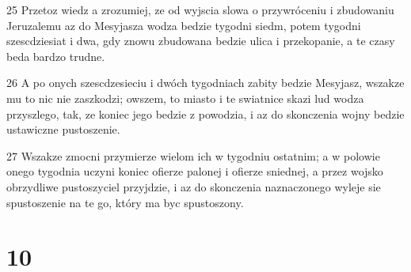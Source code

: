 \par 25 Przetoz wiedz a zrozumiej, ze od wyjscia slowa o przywróceniu i zbudowaniu Jeruzalemu az do Mesyjasza wodza bedzie tygodni siedm, potem tygodni szescdziesiat i dwa, gdy znowu zbudowana bedzie ulica i przekopanie, a te czasy beda bardzo trudne.
\par 26 A po onych szescdzesieciu i dwóch tygodniach zabity bedzie Mesyjasz, wszakze mu to nic nie zaszkodzi; owszem, to miasto i te swiatnice skazi lud wodza przyszlego, tak, ze koniec jego bedzie z powodzia, i az do skonczenia wojny bedzie ustawiczne pustoszenie.
\par 27 Wszakze zmocni przymierze wielom ich w tygodniu ostatnim; a w polowie onego tygodnia uczyni koniec ofierze palonej i ofierze sniednej, a przez wojsko obrzydliwe pustoszyciel przyjdzie, i az do skonczenia naznaczonego wyleje sie spustoszenie na te go, który ma byc spustoszony.

\chapter{10}

